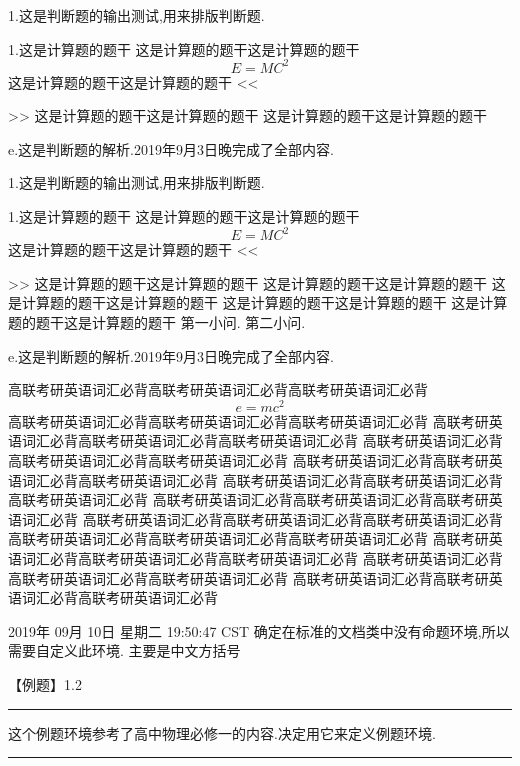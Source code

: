 \documentclass[a4paper,fontset = windowsnew]{ctexbook}
\begin{document}
\newpage

\begin{judgements}
  1.这是判断题的输出测试,用来排版判断题.

1.这是计算题的题干
这是计算题的题干这是计算题的题干
\begin{equation}
  E=MC^2
\end{equation}
这是计算题的题干这是计算题的题干
<<
>>
这是计算题的题干这是计算题的题干
这是计算题的题干这是计算题的题干

e.这是判断题的解析.2019年9月3日晚完成了全部内容.

\end{judgements}

\begin{calculations}
  1.这是判断题的输出测试,用来排版判断题.

1.这是计算题的题干
这是计算题的题干这是计算题的题干
\[  E=MC^2 \]
这是计算题的题干这是计算题的题干
<<
>>
这是计算题的题干这是计算题的题干
这是计算题的题干这是计算题的题干
这是计算题的题干这是计算题的题干
这是计算题的题干这是计算题的题干
这是计算题的题干这是计算题的题干
\qitem 第一小问.
\qitem 第二小问.

e.这是判断题的解析.2019年9月3日晚完成了全部内容.

\end{calculations}

%
高联考研英语词汇必背高联考研英语词汇必背高联考研英语词汇必背
\[e=mc^2\]
高联考研英语词汇必背高联考研英语词汇必背高联考研英语词汇必背
高联考研英语词汇必背高联考研英语词汇必背高联考研英语词汇必背
高联考研英语词汇必背高联考研英语词汇必背高联考研英语词汇必背
高联考研英语词汇必背高联考研英语词汇必背高联考研英语词汇必背
高联考研英语词汇必背高联考研英语词汇必背高联考研英语词汇必背
高联考研英语词汇必背高联考研英语词汇必背高联考研英语词汇必背
高联考研英语词汇必背高联考研英语词汇必背高联考研英语词汇必背
高联考研英语词汇必背高联考研英语词汇必背高联考研英语词汇必背
高联考研英语词汇必背高联考研英语词汇必背高联考研英语词汇必背
高联考研英语词汇必背高联考研英语词汇必背高联考研英语词汇必背
高联考研英语词汇必背高联考研英语词汇必背高联考研英语词汇必背



2019年 09月 10日 星期二 19:50:47 CST
确定在标准的文档类中没有命题环境,所以需要自定义此环境.
主要是中文方括号

\parindent=0pt
【{\heiti 例题}】1.2
\vspace{2pt}
\hrule
\vspace{10pt}

\ccwd
 这个例题环境参考了高中物理必修一的内容.决定用它来定义例题环境.

\vspace{10pt}
\hrule
\end{document}
